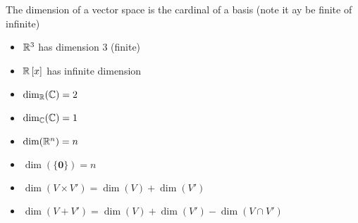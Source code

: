 \begin{definition}[Dimension]
	The dimension of a vector space is the cardinal of a basis (note it ay be finite of infinite)
\end{definition}
\begin{example}
	\begin{itemize}
		\item $\mathbb{R}^3$ has dimension 3 (finite)
		\item $\mathbb{R}\left[ x \right]$ has infinite dimension
		\item $\dim_{\mathbb{R}}(\mathbb{C})=2$
		\item $\dim_{\mathbb{C}}(\mathbb{C})=1$
		\item $\dim(\mathbb{R}^n)=n$
		\item $\dim(\{\textbf{0}\})=n$
		
	\end{itemize}
\end{example}
\begin{property}
	\begin{itemize}
		\item $\dim(V \times V')=\dim(V)+\dim(V')$
		\item $\dim(V + V')=\dim(V)+\dim(V')-\dim(V \cap V')$
	\end{itemize}
\end{property}

